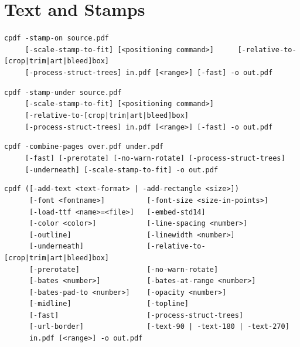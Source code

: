 \documentclass{book}
\begin{document}
\chapter{Text and Stamps}\label{chap:8}
\label{stamps}
  \begin{framed}
  \noindent\small\verb!cpdf -stamp-on source.pdf!\\
  \noindent\small\verb!     [-scale-stamp-to-fit] [<positioning command>]!
  \noindent\small\verb!     [-relative-to-[crop|trim|art|bleed]box] !\\
  \noindent\small\verb!     [-process-struct-trees] in.pdf [<range>] [-fast] -o out.pdf!
  
  \vspace{1.5mm}
  \noindent\small\verb!cpdf -stamp-under source.pdf!\\
  \noindent\small\verb!     [-scale-stamp-to-fit] [<positioning command>]!\\
  \noindent\small\verb!     [-relative-to-[crop|trim|art|bleed]box]!\\
  \noindent\small\verb!     [-process-struct-trees] in.pdf [<range>] [-fast] -o out.pdf!

  \vspace{1.5mm}
  \noindent\small\verb!cpdf -combine-pages over.pdf under.pdf!\\
  \noindent\small\verb!     [-fast] [-prerotate] [-no-warn-rotate] [-process-struct-trees]!\\
  \noindent\small\verb!     [-underneath] [-scale-stamp-to-fit] -o out.pdf!


  \vspace{0.1mm}
  \noindent\small\begin{verbatim}
cpdf ([-add-text <text-format> | -add-rectangle <size>])
      [-font <fontname>]          [-font-size <size-in-points>]
      [-load-ttf <name>=<file>]   [-embed-std14]
      [-color <color>]            [-line-spacing <number>]
      [-outline]                  [-linewidth <number>]
      [-underneath]               [-relative-to-[crop|trim|art|bleed]box]
      [-prerotate]                [-no-warn-rotate]
      [-bates <number>]           [-bates-at-range <number>]
      [-bates-pad-to <number>]    [-opacity <number>]
      [-midline]                  [-topline]
      [-fast]                     [-process-struct-trees]
      [-url-border]               [-text-90 | -text-180 | -text-270]
      in.pdf [<range>] -o out.pdf\end{verbatim}


\end{framed}
\end{document}
